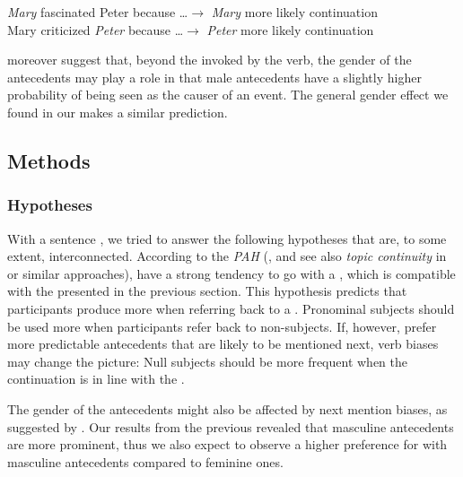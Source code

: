 \documentclass[output=paper,colorlinks,citecolor=brown]{langscibook}
\begin{document}
\ea \ea \label{subj_bias:Istrate}
\textit{Mary} fascinated Peter because \ldots $\rightarrow$ \textit{Mary} more likely continuation
\\
\ex \label{obj_bias:Istrate} Mary criticized \textit{Peter} because \ldots $\rightarrow$ \textit{Peter} more likely continuation
\\
\z \z

\citet{ferstl2011implicit} moreover suggest that, beyond the  invoked by the verb, the gender of the antecedents may play a role in that male antecedents have a slightly higher probability of being seen as the causer of an event. The general gender effect we found in our  makes a similar prediction.

\subsection{Methods}

\subsubsection{Hypotheses} 
With a sentence , we tried to answer the following hypotheses that are, to some extent, interconnected. 
According to the \textit{PAH} (\citealt{carminati2002processing}, and see also \textit{topic continuity} in \citealt{givon1983topic} or similar approaches),  have a strong tendency to go with a  , which is compatible with the  presented in the previous section. This hypothesis predicts that participants produce more  when referring back to a  . Pronominal subjects should be used more when participants refer back to non-subjects. If, however,  prefer more predictable antecedents that are likely to be mentioned next, verb biases may change the picture: Null subjects should be more frequent when the continuation is in line with the .

The gender of the antecedents might also be affected by next mention biases, as suggested by \citet{ferstl2011implicit}. Our results from the previous  revealed that masculine antecedents are more prominent, thus we also expect to observe a higher preference for  with masculine antecedents compared to feminine ones. 
\end{document}
